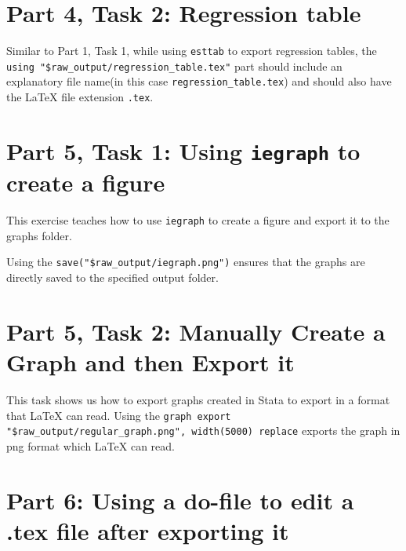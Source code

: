 \documentclass[]{article}
\begin{document}
\section*{Part 4, Task 2: Regression table}

Similar to Part 1, Task 1, while using \texttt{esttab} to export regression tables, the \verb|using "$raw_output/regression_table.tex"| part should include an explanatory file name(in this case \texttt{regression\_table.tex}) and should also have the {\LaTeX} file extension \texttt{.tex}.

\section*{Part 5, Task 1: Using \texttt{iegraph} to create a figure}


This exercise teaches how to use \texttt{iegraph} to create a figure and export it to the graphs folder. 

Using the \verb|save("$raw_output/iegraph.png")| ensures that the graphs are directly saved to the specified output folder. 

\section*{Part 5, Task 2: Manually Create a Graph and then Export it}


This task shows us how to export graphs created in Stata to export in a format that {\LaTeX} can read. Using the \verb|graph export "$raw_output/regular_graph.png", width(5000) replace| 
exports the graph in png format which {\LaTeX} can read.


\section*{Part 6: Using a do-file to edit a .tex file after exporting it}

\end{document}
